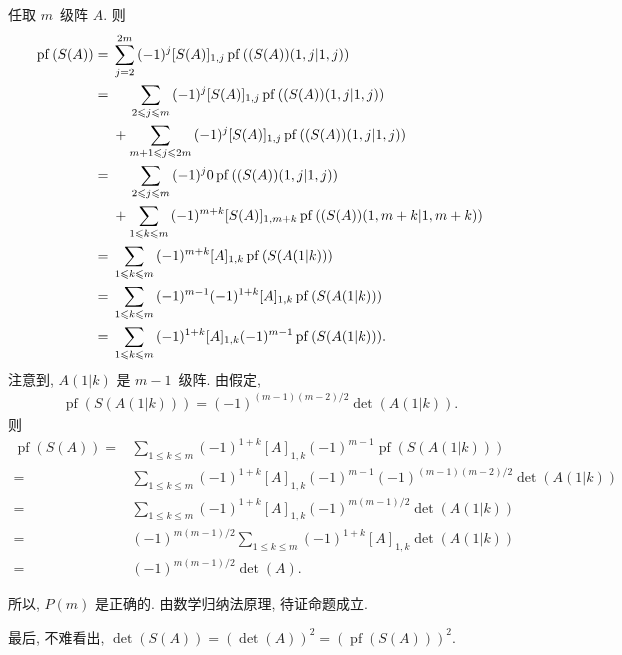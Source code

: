 \begin{example}
    任取 \(m\)~级阵 \(A\).
    则
    \begin{align*}
        \operatorname{pf} {(S(A))}
        = {} &
        \sum_{j=2}^{2m}
        {(-1)^j [S(A)]_{1,j} \operatorname{pf} {((S(A))({1,j}|{1,j}))}}
        \\
        = {} &
        \hphantom{{} + {}}
        \sum_{2 \leq j \leq m}
        {(-1)^j [S(A)]_{1,j} \operatorname{pf} {((S(A))({1,j}|{1,j}))}}
        \\
             & +
        \sum_{m+1 \leq j \leq 2m}
        {(-1)^j [S(A)]_{1,j} \operatorname{pf} {((S(A))({1,j}|{1,j}))}}
        \\
        = {} &
        \hphantom{{} + {}}
        \sum_{2 \leq j \leq m}
        {(-1)^j 0 \operatorname{pf} {((S(A))({1,j}|{1,j}))}}
        \\
             & +
        \sum_{1 \leq k \leq m}
        {(-1)^{m+k} [S(A)]_{1,m+k}
        \operatorname{pf} {((S(A))({1,m+k}|{1,m+k}))}}
        \\
        = {} &
        \sum_{1 \leq k \leq m}
        {(-1)^{m+k} [A]_{1,k}
            \operatorname{pf} {(S(A(1|k)))}}
        \\
        = {} &
        \sum_{1 \leq k \leq m}
        {(-1)^{m-1} (-1)^{1+k} [A]_{1,k}
            \operatorname{pf} {(S(A(1|k)))}}
        \\
        = {} &
        \sum_{1 \leq k \leq m}
        {(-1)^{1+k} [A]_{1,k}
            (-1)^{m-1} \operatorname{pf} {(S(A(1|k)))}}.
    \end{align*}
    注意到, \(A(1|k)\) 是 \(m-1\)~级阵.
    由假定,
    \begin{align*}
        \operatorname{pf} {(S(A(1|k)))}
        = (-1)^{(m-1)(m-2)/2} \det {(A(1|k))}.
    \end{align*}
    则
    \begin{align*}
        \operatorname{pf} {(S(A))}
        = {} &
        \sum_{1 \leq k \leq m}
        {(-1)^{1+k} [A]_{1,k}
            (-1)^{m-1} \operatorname{pf} {(S(A(1|k)))}}
        \\
        = {} &
        \sum_{1 \leq k \leq m}
        {(-1)^{1+k} [A]_{1,k}
            (-1)^{m-1} (-1)^{(m-1)(m-2)/2} \det {(A(1|k))}}
        \\
        = {} &
        \sum_{1 \leq k \leq m}
        {(-1)^{1+k} [A]_{1,k}
            (-1)^{m(m-1)/2} \det {(A(1|k))}}
        \\
        = {} &
        (-1)^{m(m-1)/2}
        \sum_{1 \leq k \leq m}
        {(-1)^{1+k} [A]_{1,k}
            \det {(A(1|k))}}
        \\
        = {} &
        (-1)^{m(m-1)/2} \det {(A)}.
    \end{align*}

    所以, \(P(m)\) 是正确的.
    由数学归纳法原理, 待证命题成立.

    最后, 不难看出,
    \(\det {(S(A))} = (\det {(A)})^2
    = (\operatorname{pf} {(S(A))})^2\).
\end{example}

